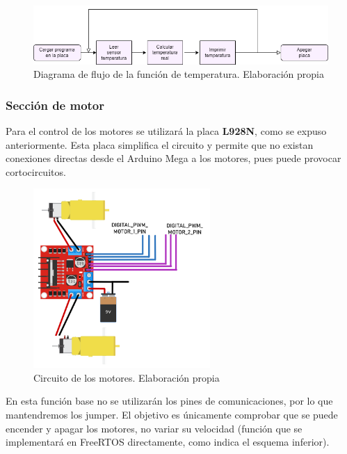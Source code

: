\begin{figure}[H]
    \centering
    \includegraphics[width=1\textwidth]{imagenes/diagramas/temp_base.png}
    \caption{Diagrama de flujo de la función de temperatura. Elaboración propia}
\end{figure}




\subsubsection{Sección de motor}

Para el control de los motores se utilizará la placa \textbf{L928N}, como se expuso anteriormente. Esta placa simplifica el circuito y permite que no existan conexiones directas desde el Arduino Mega a los motores, pues puede provocar cortocircuitos. 

\begin{figure}[H]
    \centering
    \includegraphics[width=0.6\textwidth]{imagenes/diagramas/motor_ard.png}
    \caption{Circuito de los motores. Elaboración propia}
\end{figure}

En esta función base no se utilizarán los pines de comunicaciones, por lo que mantendremos los jumper. El objetivo es únicamente comprobar que se puede encender y apagar los motores, no variar su velocidad (función que se implementará en FreeRTOS directamente, como indica el esquema inferior).

